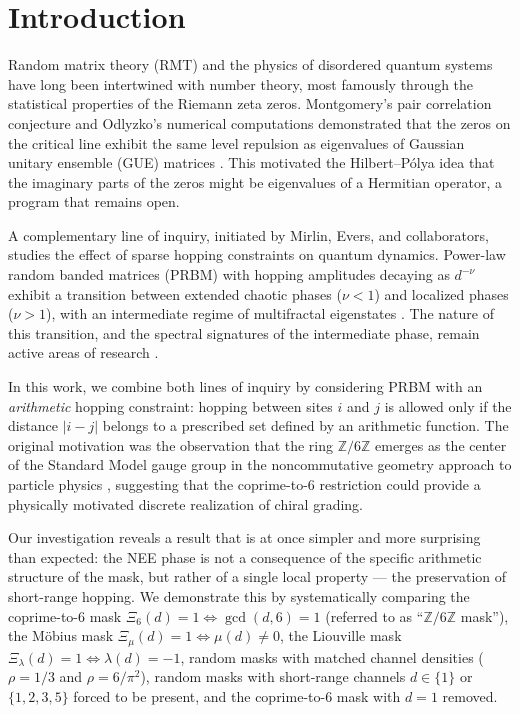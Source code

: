 \documentclass[11pt,a4paper]{article}
\begin{document}
\section{Introduction}
\label{sec:introduction}

Random matrix theory (RMT) and the physics of disordered quantum systems
have long been intertwined with number theory, most famously through the
statistical properties of the Riemann zeta zeros. Montgomery's pair
correlation conjecture and Odlyzko's numerical computations demonstrated
that the zeros on the critical line exhibit the same level repulsion as
eigenvalues of Gaussian unitary ensemble (GUE) matrices
\cite{Montgomery1973,Odlyzko2001}. This motivated the Hilbert--P\'olya
idea that the imaginary parts of the zeros might be eigenvalues of a
Hermitian operator, a program that remains open.

A complementary line of inquiry, initiated by Mirlin, Evers, and
collaborators, studies the effect of sparse hopping constraints on quantum
dynamics. Power-law random banded matrices (PRBM) with hopping amplitudes
decaying as $d^{-\nu}$ exhibit a transition between extended chaotic phases
($\nu < 1$) and localized phases ($\nu > 1$), with an intermediate regime
of multifractal eigenstates \cite{Mirlin1996}. The nature of this transition,
and the spectral signatures of the intermediate phase, remain active areas
of research \cite{Kravtsov2015,Khaymovich2021,Legramandi2024}.

In this work, we combine both lines of inquiry by considering PRBM with an
\emph{arithmetic} hopping constraint: hopping between sites $i$ and $j$ is
allowed only if the distance $|i-j|$ belongs to a prescribed set defined by
an arithmetic function. The original motivation was the observation that
the ring $\mathbb{Z}/6\mathbb{Z}$ emerges as the center of the Standard
Model gauge group in the noncommutative geometry approach to particle
physics \cite{Connes2008,Chamseddine2007}, suggesting that the coprime-to-$6$
restriction could provide a physically motivated discrete realization of
chiral grading.

Our investigation reveals a result that is at once simpler and more
surprising than expected: the NEE phase is not a consequence of the
specific arithmetic structure of the mask, but rather of a single local
property — the preservation of short-range hopping. We demonstrate this
by systematically comparing the coprime-to-6 mask $\Xi_6(d) = 1 \iff
\gcd(d,6)=1$ (referred to as ``$\mathbb{Z}/6\mathbb{Z}$ mask''), the
Möbius mask $\Xi_\mu(d) = 1 \iff \mu(d) \neq 0$, the Liouville mask
$\Xi_\lambda(d) = 1 \iff \lambda(d) = -1$, random masks with matched
channel densities ($\rho = 1/3$ and $\rho = 6/\pi^2$), random masks with
short-range channels $d \in \{1\}$ or $\{1, 2, 3, 5\}$ forced to be present,
and the coprime-to-6 mask with $d = 1$ removed.
\end{document}
